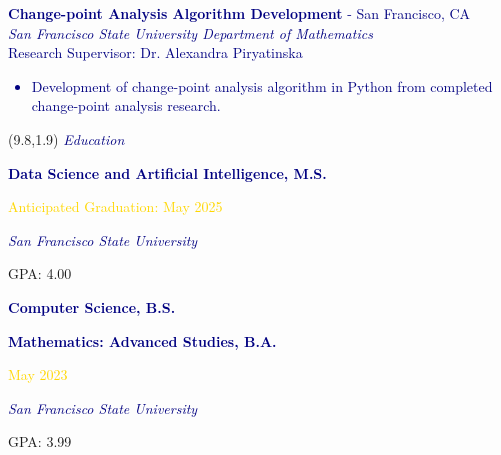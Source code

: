 \documentclass[hidelinks, 10pt]{article}
\newcommand{\bodyspacing}{1mm}
\begin{document}
\begin{textblock}{8.75}
    \vspace{\bodyspacing}

    \textcolor{navy}{{\textbf{Change-point Analysis Algorithm Development} - San Francisco, CA}\\
        \emph{San Francisco State University Department of Mathematics}\\
        Research Supervisor: Dr. Alexandra Piryatinska
        \begin{itemize}[leftmargin=5mm]
            \setlength\itemsep{-0.25em}
            \item Development of change-point analysis algorithm in Python from
                  completed change-point analysis research.
        \end{itemize}}
\end{textblock}


\begin{textblock}{4}(9.8,1.9)
    \setlength{\parindent}{0cm}
    \large{\textcolor{navy}{\textit{Education}}}

    \vspace{1mm}

    \footnotesize\textcolor{navy}{\scriptsize\textbf{Data Science and Artificial
            Intelligence, M.S.}}

    \vspace{0.5mm}

    \scriptsize\textcolor{gold}{\scriptsize Anticipated Graduation: May 2025}

    \vspace{0.5mm}

    \scriptsize\textcolor{navy}{\scriptsize\emph{San Francisco State University}}

    \vspace{0.5mm}

    \scriptsize{\scriptsize GPA: 4.00}

    \vspace{1mm}

    \footnotesize\textcolor{navy}{\scriptsize\textbf{Computer Science, B.S.}}

    \footnotesize\textcolor{navy}{\scriptsize\textbf{Mathematics: Advanced Studies, B.A.}}

    \vspace{0.5mm}

    \scriptsize\textcolor{gold}{\scriptsize May 2023}

    \vspace{0.5mm}

    \scriptsize\textcolor{navy}{\scriptsize\emph{San Francisco State University}}

    \vspace{0.5mm}

    \scriptsize{\scriptsize GPA: 3.99}
\end{textblock}
\end{document}
